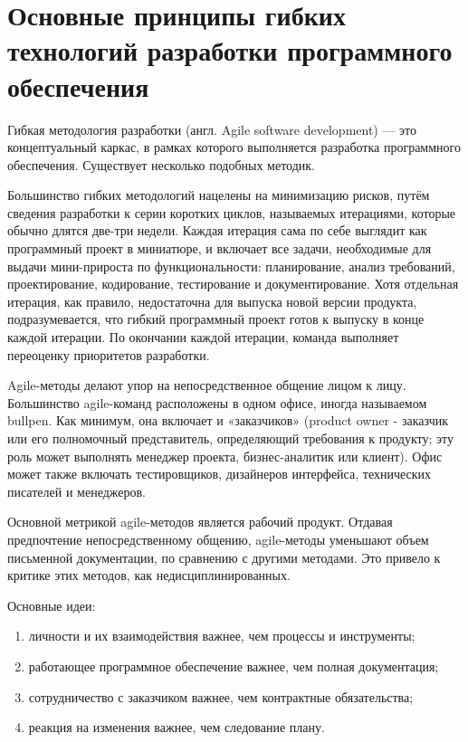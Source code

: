\documentclass{article}
\begin{document}
\section{Основные принципы гибких технологий разработки программного обеспечения}
    Гибкая методология разработки (англ. Agile software development) — это концептуальный каркас, в рамках которого выполняется разработка программного обеспечения. Существует несколько подобных методик.

    Большинство гибких методологий нацелены на минимизацию рисков, путём сведения разработки к серии коротких циклов, называемых итерациями, которые обычно длятся две-три недели. Каждая итерация сама по себе выглядит как программный проект в миниатюре, и включает все задачи, необходимые для выдачи мини-прироста по функциональности: планирование, анализ требований, проектирование, кодирование, тестирование и документирование. Хотя отдельная итерация, как правило, недостаточна для выпуска новой версии продукта, подразумевается, что гибкий программный проект готов к выпуску в конце каждой итерации. По окончании каждой итерации, команда выполняет переоценку приоритетов разработки.

    Agile-методы делают упор на непосредственное общение лицом к лицу. Большинство agile-команд расположены в одном офисе, иногда называемом bullpen. Как минимум, она включает и «заказчиков» (product owner - заказчик или его полномочный представитель, определяющий требования к продукту; эту роль может выполнять менеджер проекта, бизнес-аналитик или клиент). Офис может также включать тестировщиков, дизайнеров интерфейса, технических писателей и менеджеров.

    Основной метрикой agile-методов является рабочий продукт. Отдавая предпочтение непосредственному общению, agile-методы уменьшают объем письменной документации, по сравнению с другими методами. Это привело к критике этих методов, как недисциплинированных.

    Основные идеи:
    \begin{enumerate}
        \item личности и их взаимодействия важнее, чем процессы и инструменты;
        \item работающее программное обеспечение важнее, чем полная документация;
        \item сотрудничество с заказчиком важнее, чем контрактные обязательства;
        \item реакция на изменения важнее, чем следование плану.
    \end{enumerate}
\end{document}
